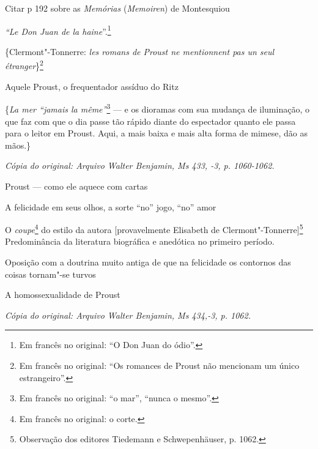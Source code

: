 Citar p 192 sobre as \emph{Memórias} (\emph{Memoiren}) de Montesquiou

\emph{``Le Don Juan de la haine}''.\footnote{Em francês no original: ``O Don Juan do ódio''. \versal{[N. T.]}}

\{Clermont"-Tonnerre: \emph{les romans de Proust ne mentionnent pas un
seul étranger}\}\footnote{Em francês no original: ``Os romances
  de Proust não mencionam um único estrangeiro''. \versal{[N. T.]}}

Aquele Proust, o frequentador assíduo do Ritz

\{\emph{La mer ``jamais la même''}\footnote{Em francês no original: ``o mar'', ``nunca o mesmo''. \versal{[N. T.]}} --- e os dioramas com sua
mudança de iluminação, o que faz com que o dia passe tão rápido diante
do espectador quanto ele passa para o leitor em Proust. Aqui, a mais
baixa e mais alta forma de mimese, dão as mãos.\}


\begin{flushright}
\emph{\small{Cópia do original: Arquivo Walter Benjamin, Ms 433, -3, p. 1060-1062.}}
\end{flushright}

Proust --- como ele aquece com cartas

A felicidade em seus olhos, a sorte ``no'' jogo, ``no'' amor

O \emph{coupe}\footnote{Em francês no original: o corte. \versal{[N. T.]}} do
estilo da autora {[}provavelmente Elisabeth de Clermont"-Tonnerre{]}\footnote{Observação dos editores Tiedemann e
  Schwepenhäuser, p. 1062. \versal{[N. E.]}} Predominância da literatura biográfica e
anedótica no primeiro período.

Oposição com a doutrina muito antiga de que na felicidade os contornos
das coisas tornam"-se turvos

A homossexualidade de Proust

\begin{flushright}
\emph{\small{Cópia do original: Arquivo Walter Benjamin, Ms 434,-3, p. 1062.}}
\end{flushright}

